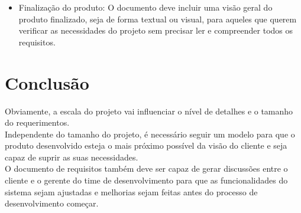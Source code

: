\documentclass[12pt,a4paper,final]{report}
\begin{document}
\begin{itemize}
\item Finalização do produto: O documento deve incluir uma visão geral do produto finalizado, seja de forma textual ou visual, para aqueles que querem verificar as necessidades do projeto sem precisar ler e compreender todos os requisitos.\\
\end{itemize}

\section*{Conclusão}

Obviamente, a escala do projeto vai influenciar o nível de detalhes e o tamanho do requerimentos.\\
Independente do tamanho do projeto, é necessário seguir um modelo para que o produto desenvolvido esteja o mais próximo possível da visão do cliente e seja capaz de suprir as suas necessidades.\\
O documento de requisitos também deve ser capaz de gerar discussões entre o cliente e o gerente do time de desenvolvimento para que as funcionalidades do sistema sejam ajustadas e melhorias sejam feitas antes do processo de desenvolvimento começar.
\end{document}
